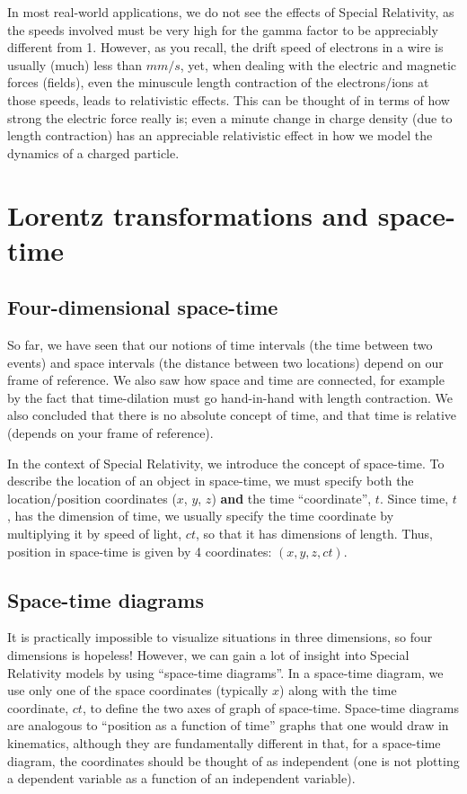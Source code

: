 In most real-world applications, we do not see the effects of Special Relativity, as the speeds involved must be very high for the gamma factor to be appreciably different from 1. However, as you recall, the drift speed of electrons in a wire is usually (much) less than $\si{mm/s}$, yet, when dealing with the electric and magnetic forces (fields), even the minuscule length contraction of the electrons/ions at those speeds, leads to relativistic effects. This can be thought of in terms of how strong the electric force really is; even a minute change in charge density (due to length contraction) has an appreciable relativistic effect in how we model the dynamics of a charged particle.

\section{Lorentz transformations and space-time}
\subsection{Four-dimensional space-time}
So far, we have seen that our notions of time intervals (the time between two events) and space intervals (the distance between two locations) depend on our frame of reference. We also saw how space and time are connected, for example by the fact that time-dilation must go hand-in-hand with length contraction. We also concluded that there is no absolute concept of time, and that time is relative (depends on your frame of reference). 

In the context of Special Relativity, we introduce the concept of space-time. To describe the location of an object in space-time, we must specify both the location/position coordinates ($x$, $y$, $z$) \textbf{and} the time ``coordinate'', $t$. Since time, $t$, has the dimension of time, we usually specify the time coordinate by multiplying it by speed of light, $ct$, so that it has dimensions of length. Thus, position in space-time is given by 4 coordinates: $(x,y,z,ct)$.

 
\subsection{Space-time diagrams}
It is practically impossible to visualize situations in three dimensions, so four dimensions is hopeless! However, we can gain a lot of insight into Special Relativity models by using ``space-time diagrams''. In a space-time diagram, we use only one of the space coordinates (typically $x$) along with the time coordinate, $ct$, to define the two axes of graph of space-time. Space-time diagrams are analogous to ``position as a function of time'' graphs that one would draw in kinematics, although they are fundamentally different in that, for a space-time diagram, the coordinates should be thought of as independent (one is not plotting a dependent variable as a function of an independent variable).


